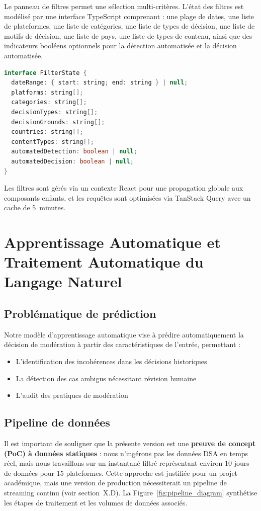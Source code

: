 \documentclass[10pt,twocolumn,a4paper]{article}
\begin{document}
Le panneau de filtres permet une sélection multi-critères. L'état des filtres est modélisé par une interface TypeScript comprenant : une plage de dates, une liste de plateformes, une liste de catégories, une liste de types de décision, une liste de motifs de décision, une liste de pays, une liste de types de contenu, ainsi que des indicateurs booléens optionnels pour la détection automatisée et la décision automatisée.

\begin{lstlisting}[language=Java, caption={Modèle de l'état des filtres}]
interface FilterState {
  dateRange: { start: string; end: string } | null;
  platforms: string[];
  categories: string[];
  decisionTypes: string[];
  decisionGrounds: string[];
  countries: string[];
  contentTypes: string[];
  automatedDetection: boolean | null;
  automatedDecision: boolean | null;
}
\end{lstlisting}

Les filtres sont gérés via un contexte React pour une propagation globale aux composants enfants, et les requêtes sont optimisées via TanStack Query avec un cache de 5~minutes.

\section{Apprentissage Automatique et Traitement Automatique du Langage Naturel}

\subsection{Problématique de prédiction}

Notre modèle d'apprentissage automatique vise à prédire automatiquement la décision de modération à partir des caractéristiques de l'entrée, permettant :
\begin{itemize}
    \item L'identification des incohérences dans les décisions historiques
    \item La détection des cas ambigus nécessitant révision humaine
    \item L'audit des pratiques de modération
\end{itemize}

\subsection{Pipeline de données}

Il est important de souligner que la présente version est une \textbf{preuve de concept (PoC) à données statiques} : nous n'ingérons pas les données DSA en temps réel, mais nous travaillons sur un instantané filtré représentant environ 10 jours de données pour 15 plateformes. Cette approche est justifiée pour un projet académique, mais une version de production nécessiterait un pipeline de streaming continu (voir section~X.D). La Figure~\ref{fig:pipeline_diagram} synthétise les étapes de traitement et les volumes de données associés.
\end{document}
